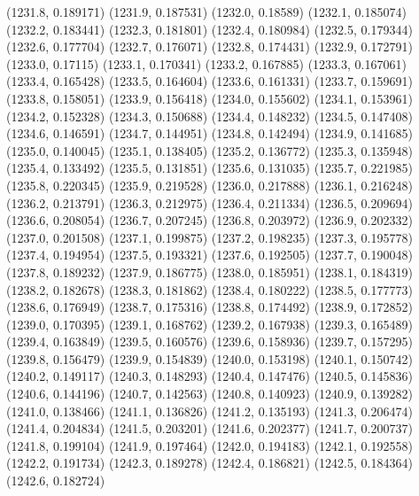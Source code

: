 {					(1231.8, 0.189171)
					(1231.9, 0.187531)
					(1232.0, 0.18589)
					(1232.1, 0.185074)
					(1232.2, 0.183441)
					(1232.3, 0.181801)
					(1232.4, 0.180984)
					(1232.5, 0.179344)
					(1232.6, 0.177704)
					(1232.7, 0.176071)
					(1232.8, 0.174431)
					(1232.9, 0.172791)
					(1233.0, 0.17115)
					(1233.1, 0.170341)
					(1233.2, 0.167885)
					(1233.3, 0.167061)
					(1233.4, 0.165428)
					(1233.5, 0.164604)
					(1233.6, 0.161331)
					(1233.7, 0.159691)
					(1233.8, 0.158051)
					(1233.9, 0.156418)
					(1234.0, 0.155602)
					(1234.1, 0.153961)
					(1234.2, 0.152328)
					(1234.3, 0.150688)
					(1234.4, 0.148232)
					(1234.5, 0.147408)
					(1234.6, 0.146591)
					(1234.7, 0.144951)
					(1234.8, 0.142494)
					(1234.9, 0.141685)
					(1235.0, 0.140045)
					(1235.1, 0.138405)
					(1235.2, 0.136772)
					(1235.3, 0.135948)
					(1235.4, 0.133492)
					(1235.5, 0.131851)
					(1235.6, 0.131035)
					(1235.7, 0.221985)
					(1235.8, 0.220345)
					(1235.9, 0.219528)
					(1236.0, 0.217888)
					(1236.1, 0.216248)
					(1236.2, 0.213791)
					(1236.3, 0.212975)
					(1236.4, 0.211334)
					(1236.5, 0.209694)
					(1236.6, 0.208054)
					(1236.7, 0.207245)
					(1236.8, 0.203972)
					(1236.9, 0.202332)
					(1237.0, 0.201508)
					(1237.1, 0.199875)
					(1237.2, 0.198235)
					(1237.3, 0.195778)
					(1237.4, 0.194954)
					(1237.5, 0.193321)
					(1237.6, 0.192505)
					(1237.7, 0.190048)
					(1237.8, 0.189232)
					(1237.9, 0.186775)
					(1238.0, 0.185951)
					(1238.1, 0.184319)
					(1238.2, 0.182678)
					(1238.3, 0.181862)
					(1238.4, 0.180222)
					(1238.5, 0.177773)
					(1238.6, 0.176949)
					(1238.7, 0.175316)
					(1238.8, 0.174492)
					(1238.9, 0.172852)
					(1239.0, 0.170395)
					(1239.1, 0.168762)
					(1239.2, 0.167938)
					(1239.3, 0.165489)
					(1239.4, 0.163849)
					(1239.5, 0.160576)
					(1239.6, 0.158936)
					(1239.7, 0.157295)
					(1239.8, 0.156479)
					(1239.9, 0.154839)
					(1240.0, 0.153198)
					(1240.1, 0.150742)
					(1240.2, 0.149117)
					(1240.3, 0.148293)
					(1240.4, 0.147476)
					(1240.5, 0.145836)
					(1240.6, 0.144196)
					(1240.7, 0.142563)
					(1240.8, 0.140923)
					(1240.9, 0.139282)
					(1241.0, 0.138466)
					(1241.1, 0.136826)
					(1241.2, 0.135193)
					(1241.3, 0.206474)
					(1241.4, 0.204834)
					(1241.5, 0.203201)
					(1241.6, 0.202377)
					(1241.7, 0.200737)
					(1241.8, 0.199104)
					(1241.9, 0.197464)
					(1242.0, 0.194183)
					(1242.1, 0.192558)
					(1242.2, 0.191734)
					(1242.3, 0.189278)
					(1242.4, 0.186821)
					(1242.5, 0.184364)
					(1242.6, 0.182724)
}
